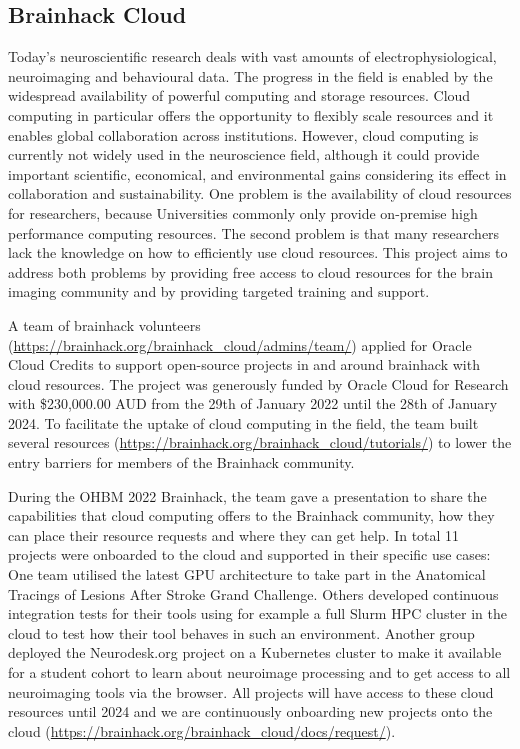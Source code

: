 \documentclass[../main.tex]{subfiles}
\begin{document}
\subsection{Brainhack Cloud}\label{sec:BHC}


Today’s neuroscientific research deals with vast amounts of electrophysiological, neuroimaging and behavioural data. The progress in the field is enabled by the widespread availability of powerful computing and storage resources. Cloud computing in particular offers the opportunity to flexibly scale resources and it enables global collaboration across institutions. However, cloud computing is currently not widely used in the neuroscience field, although it could provide important scientific, economical, and environmental gains considering its effect in collaboration and sustainability\citep{apon2015, OracleSustainabilty}. One problem is the availability of cloud resources for researchers, because Universities commonly only provide on-premise high performance computing resources. The second problem is that many researchers lack the knowledge on how to efficiently use cloud resources. This project aims to address both problems by providing free access to cloud resources for the brain imaging community and by providing targeted training and support.

A team of brainhack volunteers (\url{https://brainhack.org/brainhack_cloud/admins/team/}) applied for Oracle Cloud Credits to support open-source projects in and around brainhack with cloud resources. The project was generously funded by Oracle Cloud for Research\citep{OracleResearch} with \$230,000.00 AUD from the 29th of January 2022 until the 28th of January 2024. To facilitate the uptake of cloud computing in the field, the team built several resources (\url{https://brainhack.org/brainhack_cloud/tutorials/}) to lower the entry barriers for members of the Brainhack community. 

During the OHBM 2022 Brainhack, the team gave a presentation to share the capabilities that cloud computing offers to the Brainhack community, how they can place their resource requests and where they can get help. In total 11 projects were onboarded to the cloud and supported in their specific use cases: One team utilised the latest GPU architecture to take part in the Anatomical Tracings of Lesions After Stroke Grand Challenge. Others developed continuous integration tests for their tools using for example a full Slurm HPC cluster in the cloud to test how their tool behaves in such an environment. Another group deployed the Neurodesk.org\citep{NeuroDesk} project on a Kubernetes cluster to make it available for a student cohort to learn about neuroimage processing and to get access to all neuroimaging tools via the browser. All projects will have access to these cloud resources until 2024 and we are continuously onboarding new projects onto the cloud (\url{https://brainhack.org/brainhack_cloud/docs/request/}).
\end{document}
